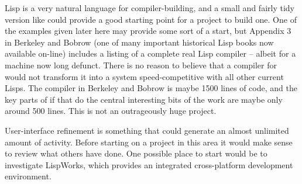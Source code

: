 Lisp is a very natural language for compiler-building, and a small and
fairly tidy version like \vsl{} could provide a good starting point for
a project to build one. One of the examples given later here may provide
some sort of a start, but Appendix 3 in Berkeley and Bobrow\cite{BandB} (one
of many important historical Lisp books now available on-line) includes
a listing of a complete real Lisp compiler -- albeit for a machine now
long defunct. There is no reason to believe that a compiler for \vsl{} would
not transform it into a system speed-competitive with all other current
Lisps. The compiler in Berkeley and Bobrow is maybe 1500 lines of
code, and the key parts of if that do the central interesting bits of the work are maybe
only around 500 lines. This is not an outrageously huge project.

User-interface refinement is something that could generate an almost
unlimited amount of activity. Before starting on a project in this area it
would make sense to review what others have done. One possible
place to start would be to investigate LispWorks\cite{LispWorks},
which provides an integrated cross-platform development environment.




